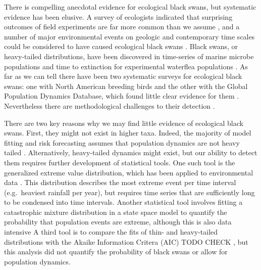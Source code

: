 There is compelling anecdotal evidence for ecological black swans, but systematic evidence has been elusive. A survey of ecologists indicated that surprising outcomes of field experiments are far more common than we assume \citep{doak2008}, and a number of major environmental events on geologic and contemporary time scales could be considered to have caused ecological black swans \citep{nunez2012}. Black swans, or heavy-tailed distributions, have been discovered in time-series of marine microbe populations \citet{segura2013} and time to extinction for experimental waterflea populations \citet{drake2014}. As far as we can tell there have been two systematic surveys for ecological black swans: one with North American breeding birds and the other with the Global Population Dynamics Database, which found little clear evidence for them \citep{keitt1998,allen2001,halley2002}. Nevertheless there are methodological challenges to their detection \citep{allen2001,ward2007}.

There are two key reasons why we may find little evidence of ecological black swans. First, they might not exist in higher taxa. Indeed, the majority of model fitting and risk forecasting assumes that population dynamics are not heavy tailed \citep[e.g.][]{brook2006a,dennis2006,knape2012}. Alternatively, heavy-tailed dynamics might exist, but our ability to detect them requires further development of statistical tools. One such tool is the generalized extreme value distribution, which has been applied to environmental data \citep[e.g.][]{katz2005}. This distribution describes the most extreme event per time interval (e.g.~heaviest rainfall per year), but requires time series that are sufficiently long to be condensed into time intervals. Another statistical tool involves fitting a catastrophic mixture distribution in a state space model to quantify the probability that population events are extreme, although this is also data intensive \citep{ward2007} A third tool is to compare the fits of thin- and heavy-tailed distributions with the Akaike Information Critera (AIC) TODO CHECK \citep{halley2002}, but this analysis did not quantify the probability of black swans or allow for population dynamics.

